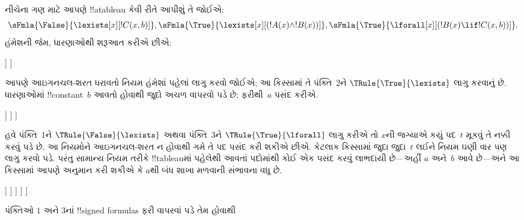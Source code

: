 \documentclass[../../../include/open-logic-section]{subfiles}
\begin{document}
\begin{ex}
નીચેના ગણ માટે આપણે !!a{tableau} કેવી રીતે આપીશું તે જોઈએ:
\[
\sFmla{\False}{\lexists[x][!C(x,b)]},
\sFmla{\True}{\lexists[x][(!A(x) \land !B(x))]},
\sFmla{\True}{\lforall[x][(!B(x) \lif !C(x,b))]}.
\]
હંમેશની જેમ, ધારણાઓથી શરૂઆત કરીએ છીએ:
\begin{oltableau}
  [\sFmla{\False}{\lexists[x][\formula{C}(x,b)]}, just=\TAss
    [\sFmla{\True}{\lexists[x][(\formula{A}(x) \land \formula{B}(x))]},
      just=\TAss
      [\sFmla{\True}{\lforall[x][(\formula{B}(x) \lif \formula{C}(x,b))]},
        just=\TAss]
    ]
  ]
\end{oltableau}
આપણે આઇગનચલ-શરત ધરાવતો નિયમ હંમેશાં પહેલાં લાગુ કરવો જોઈએ; આ કિસ્સામાં
તે પંક્તિ~$2$ને $\TRule{\True}{\lexists}$ લાગુ કરવાનું છે. ધારણાઓમાં
!!{constant}~$b$ આવતો હોવાથી જુદો અચળ વાપરવો પડે છે; ફરીથી~$a$ પસંદ
કરીએ.
\begin{oltableau}
  [\sFmla{\False}{\lexists[x][\formula{C}(x,b)]}, just=\TAss
    [\sFmla{\True}{\lexists[x][(\formula{A}(x) \land \formula{B}(x))]},
      just=\TAss, checked
      [\sFmla{\True}{\lforall[x][(\formula{B}(x) \lif \formula{C}(x,b))]},
        just=\TAss
        [\sFmla{\True}{\formula{A}(a) \land \formula{B}(a)},
          just={\TRule{\True}{\lexists}[2]}]
      ]
    ]
  ]
\end{oltableau}
હવે પંક્તિ~$1$ને $\TRule{\False}{\lexists}$ અથવા પંક્તિ~$3$ને
$\TRule{\True}{\lforall}$ લાગુ કરીએ તો $x$ની જગ્યાએ કયું પદ~$t$ મૂકવું
તે નક્કી કરવું પડે છે. આ નિયમોને આઇગનચલ-શરત ન હોવાથી ગમે તે પદ પસંદ
કરી શકીએ છીએ. કેટલાક કિસ્સામાં જુદા જુદા~$t$ લઈને નિયમ ઘણી વાર પણ
લાગુ કરવો પડે. પરંતુ સામાન્ય નિયમ તરીકે !!{tableau}માં પહેલેથી આવતાં
પદોમાંથી કોઈ એક પસંદ કરવું લાભદાયી છે---અહીં $a$ અને~$b$ આવે છે---અને
આ કિસ્સામાં આપણે અનુમાન કરી શકીએ કે $a$થી બંધ શાખા મળવાની સંભાવના વધુ
છે.
\begin{oltableau}
  [\sFmla{\False}{\lexists[x][\formula{C}(x,b)]}, just=\TAss
    [\sFmla{\True}{\lexists[x][(\formula{A}(x) \land \formula{B}(x))]},
      just=\TAss, checked
      [\sFmla{\True}{\lforall[x][(\formula{B}(x) \lif \formula{C}(x,b))]}, just=\TAss
        [\sFmla{\True}{\formula{A}(a) \land \formula{B}(a)}, just={\TRule{\True}{\lexists}[2]}
          [\sFmla{\False}{\formula{C}(a,b)}, just={\TRule{\False}{\lexists}[1]}
            [\sFmla{\True}{\formula{B}(a) \lif \formula{C}(a,b)},
              just={\TRule{\True}{\lforall}[3]}
            ]
          ]
        ]
      ]
    ]
  ]
\end{oltableau}
પંક્તિઓ $1$ અને $3$નાં !!{signed formula}s ફરી વાપરવાં પડે તેમ હોવાથી

\end{ex}
\end{document}
